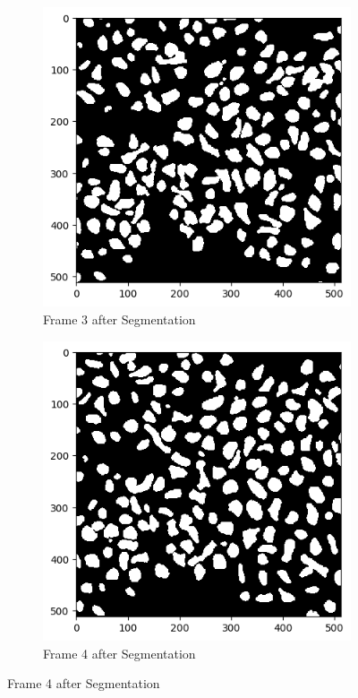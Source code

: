 \documentclass{article}
\begin{document}
\begin{figure}[h!]
  \begin{subfigure}{0.4\textwidth}
    \includegraphics[width=\linewidth]{Report/Appendix_Images/Segmentation-B-Growth/frame_3.png}
    \caption*{Frame 3 after Segmentation}
  \end{subfigure}
  \hfill
  \begin{subfigure}{0.4\textwidth}
    \includegraphics[width=\linewidth]{Report/Appendix_Images/Segmentation-B-Growth/frame_4.png}
    \caption*{Frame 4 after Segmentation}
  \end{subfigure}


\end{figure}
\end{document}
